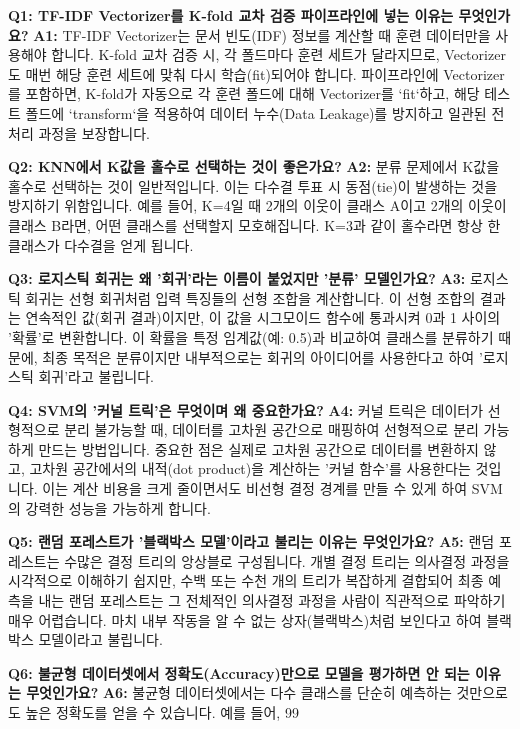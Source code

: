 \documentclass[11pt,a4paper]{article}
\begin{document}
\begin{tcolorbox}[title=\textbf{초심자를 위한 Q\&A}, colback=myyellow!10, colframe=orange!75!black, boxrule=0.8pt, arc=4pt]
\textbf{Q1: TF-IDF Vectorizer를 K-fold 교차 검증 파이프라인에 넣는 이유는 무엇인가요?}
\textbf{A1:} TF-IDF Vectorizer는 문서 빈도(IDF) 정보를 계산할 때 훈련 데이터만을 사용해야 합니다. K-fold 교차 검증 시, 각 폴드마다 훈련 세트가 달라지므로, Vectorizer도 매번 해당 훈련 세트에 맞춰 다시 학습(fit)되어야 합니다. 파이프라인에 Vectorizer를 포함하면, K-fold가 자동으로 각 훈련 폴드에 대해 Vectorizer를 `fit`하고, 해당 테스트 폴드에 `transform`을 적용하여 데이터 누수(Data Leakage)를 방지하고 일관된 전처리 과정을 보장합니다.

\textbf{Q2: KNN에서 K값을 홀수로 선택하는 것이 좋은가요?}
\textbf{A2:} 분류 문제에서 K값을 홀수로 선택하는 것이 일반적입니다. 이는 다수결 투표 시 동점(tie)이 발생하는 것을 방지하기 위함입니다. 예를 들어, K=4일 때 2개의 이웃이 클래스 A이고 2개의 이웃이 클래스 B라면, 어떤 클래스를 선택할지 모호해집니다. K=3과 같이 홀수라면 항상 한 클래스가 다수결을 얻게 됩니다.

\textbf{Q3: 로지스틱 회귀는 왜 '회귀'라는 이름이 붙었지만 '분류' 모델인가요?}
\textbf{A3:} 로지스틱 회귀는 선형 회귀처럼 입력 특징들의 선형 조합을 계산합니다. 이 선형 조합의 결과는 연속적인 값(회귀 결과)이지만, 이 값을 시그모이드 함수에 통과시켜 0과 1 사이의 '확률'로 변환합니다. 이 확률을 특정 임계값(예: 0.5)과 비교하여 클래스를 분류하기 때문에, 최종 목적은 분류이지만 내부적으로는 회귀의 아이디어를 사용한다고 하여 '로지스틱 회귀'라고 불립니다.

\textbf{Q4: SVM의 '커널 트릭'은 무엇이며 왜 중요한가요?}
\textbf{A4:} 커널 트릭은 데이터가 선형적으로 분리 불가능할 때, 데이터를 고차원 공간으로 매핑하여 선형적으로 분리 가능하게 만드는 방법입니다. 중요한 점은 실제로 고차원 공간으로 데이터를 변환하지 않고, 고차원 공간에서의 내적(dot product)을 계산하는 '커널 함수'를 사용한다는 것입니다. 이는 계산 비용을 크게 줄이면서도 비선형 결정 경계를 만들 수 있게 하여 SVM의 강력한 성능을 가능하게 합니다.

\textbf{Q5: 랜덤 포레스트가 '블랙박스 모델'이라고 불리는 이유는 무엇인가요?}
\textbf{A5:} 랜덤 포레스트는 수많은 결정 트리의 앙상블로 구성됩니다. 개별 결정 트리는 의사결정 과정을 시각적으로 이해하기 쉽지만, 수백 또는 수천 개의 트리가 복잡하게 결합되어 최종 예측을 내는 랜덤 포레스트는 그 전체적인 의사결정 과정을 사람이 직관적으로 파악하기 매우 어렵습니다. 마치 내부 작동을 알 수 없는 상자(블랙박스)처럼 보인다고 하여 블랙박스 모델이라고 불립니다.

\textbf{Q6: 불균형 데이터셋에서 정확도(Accuracy)만으로 모델을 평가하면 안 되는 이유는 무엇인가요?}
\textbf{A6:} 불균형 데이터셋에서는 다수 클래스를 단순히 예측하는 것만으로도 높은 정확도를 얻을 수 있습니다. 예를 들어, 99%
\end{tcolorbox}
\end{document}
